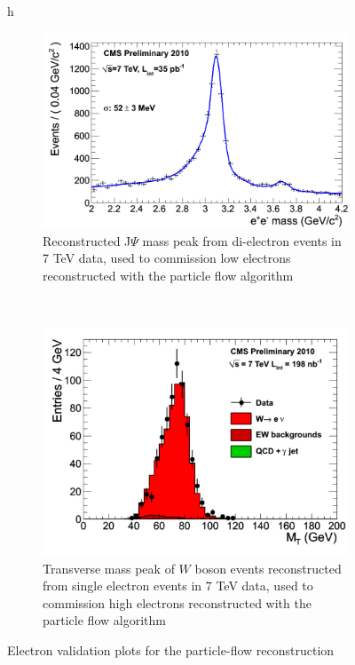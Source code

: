 \begin{figure}{h}
    \centering
    \begin{subfigure}[h]{0.40\textwidth}
        \includegraphics[width=\textwidth]{Figures/Reconstruction_Diagrams/ELE__jpsi_tk_35invpb.png}
        \caption{Reconstructed J$\Psi$ mass peak from di-electron events
          in 7 TeV data, used to commission low \PT electrons reconstructed
        with the particle flow algorithm}\label{fig:ele_jpsi_mass}
      \end{subfigure}
      ~ %
    \begin{subfigure}[h]{0.40\textwidth}
        \includegraphics[width=\textwidth]{Figures/Reconstruction_Diagrams/ELE__Welenu_7TeV.pdf}
        \caption{Transverse mass peak of $W$ boson events
          reconstructed from single electron events in 7 TeV data, used to
        commission high \PT electrons reconstructed with the particle flow
      algorithm}\label{fig:ele_w_mass}
      \end{subfigure}
      \caption{Electron validation plots for the particle-flow reconstruction}\label{fig:ele_pf_validation}
\end{figure}

